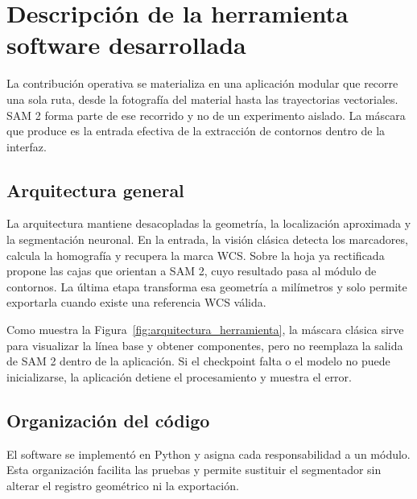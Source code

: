 \chapter[Descripción de la herramienta software desarrollada]{Descripción de la herramienta\\ software desarrollada}
\label{cap:herramienta}

La contribución operativa se materializa en una aplicación modular que recorre una sola ruta, desde la fotografía del material hasta las trayectorias vectoriales. SAM 2 forma parte de ese recorrido y no de un experimento aislado. La máscara que produce es la entrada efectiva de la extracción de contornos dentro de la interfaz.

\section{Arquitectura general}

La arquitectura mantiene desacopladas la geometría, la localización aproximada y la segmentación neuronal. En la entrada, la visión clásica detecta los marcadores, calcula la homografía y recupera la marca WCS. Sobre la hoja ya rectificada propone las cajas que orientan a SAM 2, cuyo resultado pasa al módulo de contornos. La última etapa transforma esa geometría a milímetros y solo permite exportarla cuando existe una referencia WCS válida.


Como muestra la Figura~\ref{fig:arquitectura_herramienta}, la máscara clásica sirve para visualizar la línea base y obtener componentes, pero no reemplaza la salida de SAM 2 dentro de la aplicación. Si el checkpoint falta o el modelo no puede inicializarse, la aplicación detiene el procesamiento y muestra el error.

\section{Organización del código}

El software se implementó en Python y asigna cada responsabilidad a un módulo. Esta organización facilita las pruebas y permite sustituir el segmentador sin alterar el registro geométrico ni la exportación.

